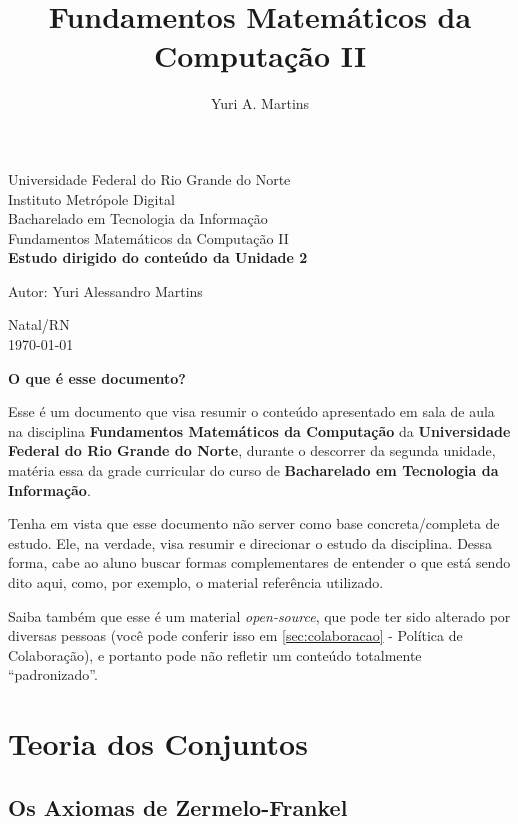 \documentclass[12pt, a4paper]{article}
\author{Yuri A. Martins}
\title{Fundamentos Matemáticos da Computação II}
\begin{document}
\begin{titlepage}
\begin{center}
{\large Universidade Federal do Rio Grande do Norte}\\[0.2cm]
{\large Instituto Metrópole Digital}\\[0.2cm]
{\large Bacharelado em Tecnologia da Informação}\\[0.2cm]
{\large Fundamentos Matemáticos da Computação II}\\[5.1cm]
{\bf \huge Estudo dirigido do conteúdo da Unidade 2}\\[5.1cm]
\end{center}
{\large Autor: Yuri Alessandro Martins}\\[0.7cm]
\begin{center}
{\large Natal/RN}\\[0.2cm]
{\large \today}
\end{center}
\end{titlepage}

\begin{center}
\large \textbf{O que é esse documento?}
\end{center}

Esse é um documento que visa resumir o conteúdo apresentado em sala de aula na disciplina \textbf{Fundamentos Matemáticos da Computação} da \textbf{Universidade Federal do Rio Grande do Norte}, durante o descorrer da segunda unidade, matéria essa da grade curricular do curso de \textbf{Bacharelado em Tecnologia da Informação}. 

Tenha em vista que esse documento não server como base concreta/completa de estudo. Ele, na verdade, visa resumir e direcionar o estudo da disciplina. Dessa forma, cabe ao aluno buscar formas complementares de entender o que está sendo dito aqui, como, por exemplo, o material referência utilizado.

Saiba também que esse é um material \textit{open-source}, que pode ter sido alterado por diversas pessoas (você pode conferir isso em \ref{sec:colaboracao} - Política de Colaboração), e portanto pode não refletir um conteúdo totalmente ``padronizado''.


\clearpage

\tableofcontents
\clearpage

\section{Teoria dos Conjuntos}
\subsection{Os Axiomas de Zermelo-Frankel}
\end{document}
